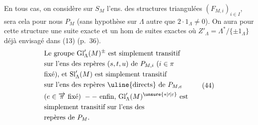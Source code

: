 En tous cas, on considère sur $S_M$ l'ens.
des structures triangulées $(F_{M,i})_{i\in I}$, 
 sera cela pour nous $P_M$ (sans hypothèse
sur $\Lambda$ autre que $2\cdot1_\Lambda\ne0$). On aura
pour cette structure une suite exacte
et un hom de suites exactes
où $Z'_\Lambda=\Lambda^*/\{\pm1_\Lambda\}$ déjà envisagé dans (13) (p.~36).
\[
\begin{aligned}
&\text{Le groupe }\mathrm{Gl}'_\Lambda(M)^{\pm}\text{ est simplement transitif}\\
&\text{sur l'ens des repères }(s,t,u)\text{ de }P_{M,i}\ (i\in\pi\\
&\text{fixé), et }\mathrm{Sl}'_\Lambda(M)\text{ est simplement transitif}\\
&\text{sur l'ens des repères \uline{directs} de }P_{M,e}\\
&(e\in\overrightarrow\pi\text{ fixé})\ --\ \text{enfin, }\mathrm{Gl}'_\Lambda(M)^{\unsure{*|\prime|\varepsilon}}\text{ est}\\
&\text{simplement transitif sur l'ens des}\\
&\text{repères de }P_M.
\end{aligned}\tag*{(44)}
\]

